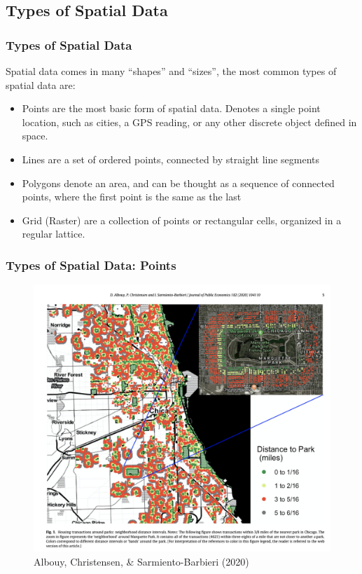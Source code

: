 \documentclass[
  shownotes,
  xcolor={svgnames},
  hyperref={colorlinks,citecolor=DarkBlue,linkcolor=DarkRed,urlcolor=DarkBlue}
   , aspectratio=169]{beamer}
\begin{document}
\subsection{Types of Spatial Data}
\begin{frame}[fragile]
\frametitle{Types of Spatial Data}
Spatial data comes in many ``shapes'' and ``sizes'', the most common types of spatial data are:
\medskip
\begin{itemize}
	\item Points are the most basic form of spatial data. Denotes a single point location, such as cities, a GPS reading, or any other discrete object defined in space.
	\medskip
	\item Lines are a set of ordered points, connected by straight line segments
	\medskip
	\item Polygons denote an area, and can be thought as a sequence of connected points, where the first point is the same as the last
	\medskip
	\item Grid (Raster) are a collection of points or rectangular cells, organized in a regular lattice.
\end{itemize}

\end{frame}
\begin{frame}[fragile]
\frametitle{Types of Spatial Data: Points}

\begin{figure}[H] \centering
  
\includegraphics[scale=0.35]{figures/albouy_et_al_fig1.png}
  \\
  \tiny Albouy, Christensen, \& Sarmiento-Barbieri (2020)
\end{figure}


\end{frame}
\end{document}
